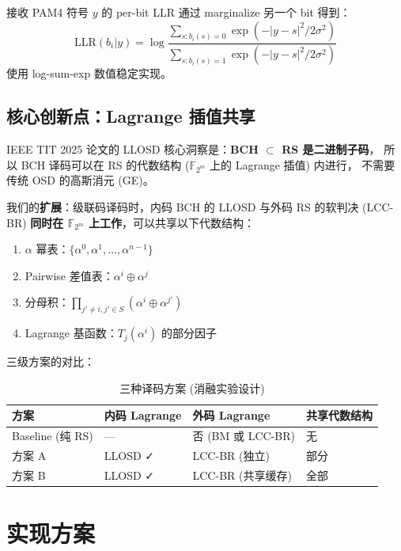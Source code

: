 \documentclass[11pt,a4paper]{article}
\begin{document}
接收 PAM4 符号 $y$ 的 per-bit LLR 通过 marginalize 另一个 bit 得到：
\begin{equation}
\text{LLR}(b_i | y) = \log \frac{\sum_{s: b_i(s)=0} \exp(-|y-s|^2 / 2\sigma^2)}
                                {\sum_{s: b_i(s)=1} \exp(-|y-s|^2 / 2\sigma^2)}
\end{equation}
使用 log-sum-exp 数值稳定实现。

\subsection{核心创新点：Lagrange 插值共享}

IEEE TIT 2025 论文的 LLOSD 核心洞察是：\textbf{BCH $\subset$ RS 是二进制子码}，
所以 BCH 译码可以在 RS 的代数结构 ($\mathbb{F}_{2^m}$ 上的 Lagrange 插值) 内进行，
不需要传统 OSD 的高斯消元 (GE)。

我们的\textbf{扩展}：级联码译码时，内码 BCH 的 LLOSD 与外码 RS 的软判决 (LCC-BR)
\textbf{同时在 $\mathbb{F}_{2^m}$ 上工作}，可以共享以下代数结构：

\begin{enumerate}[leftmargin=1.5em, itemsep=1pt]
\item $\alpha$ 幂表：$\{\alpha^0, \alpha^1, \ldots, \alpha^{n-1}\}$
\item Pairwise 差值表：$\alpha^i \oplus \alpha^j$
\item 分母积：$\prod_{j' \ne i, j' \in S} (\alpha^i \oplus \alpha^{j'})$
\item Lagrange 基函数：$T_j(\alpha^i)$ 的部分因子
\end{enumerate}

三级方案的对比：

\begin{table}[!ht]
\centering
\begin{tabularx}{\textwidth}{lXXX}
\toprule
\textbf{方案} & \textbf{内码 Lagrange} & \textbf{外码 Lagrange} & \textbf{共享代数结构} \\
\midrule
Baseline (纯 RS)   & --- & 否 (BM 或 LCC-BR) & 无 \\
方案 A            & LLOSD ✓ & LCC-BR (独立) & 部分 \\
方案 B            & LLOSD ✓ & LCC-BR (共享缓存) & 全部 \\
\bottomrule
\end{tabularx}
\caption{三种译码方案 (消融实验设计)}
\end{table}

\section{实现方案}
\end{document}
